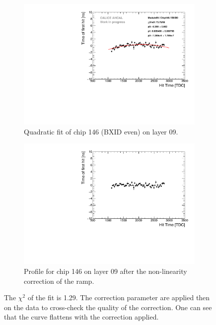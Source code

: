\begin{figure}[t]
	\begin{subfigure}[t]{0.45\textwidth}
		\centering
		\includegraphics[width=1\textwidth]{chap5/fig_AHCAL_timing/Muons/LinearityCorrection_Module09_Chip146_BXID0.pdf}
		\caption{Quadratic fit of chip 146 (BXID even) on layer 09.}\label{fig:LinCorr}
	\end{subfigure}
	\hfill
	\begin{subfigure}[t]{0.45\textwidth}
		\centering
		\includegraphics[width=1\textwidth]{chap5/fig_AHCAL_timing/Muons/LinearityCorrection_Module09_Chip146_BXID0_Corrected.pdf}
		\caption{Profile for chip 146 on layer 09 after the non-linearity correction of the ramp.}\label{fig:LinCorr_2}
	\end{subfigure}
	\caption{ The $\chi^2$ of the fit is 1.29.  The correction parameter are applied then on the data to cross-check the quality of the correction. One can see that the curve flattens with the correction applied.}
\end{figure}

